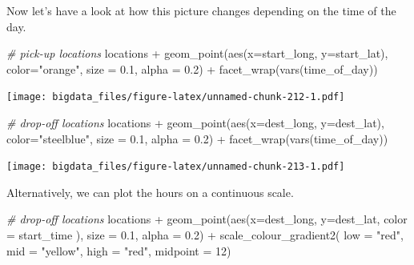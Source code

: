 \documentclass[
  12pt,
]{style/krantz}
\newenvironment{Shaded}{\begin{snugshade}}{\end{snugshade}}
\newcommand{\AttributeTok}[1]{\textcolor[rgb]{0.77,0.63,0.00}{#1}}
\newcommand{\CommentTok}[1]{\textcolor[rgb]{0.56,0.35,0.01}{\textit{#1}}}
\newcommand{\DecValTok}[1]{\textcolor[rgb]{0.00,0.00,0.81}{#1}}
\newcommand{\FloatTok}[1]{\textcolor[rgb]{0.00,0.00,0.81}{#1}}
\newcommand{\FunctionTok}[1]{\textcolor[rgb]{0.00,0.00,0.00}{#1}}
\newcommand{\NormalTok}[1]{#1}
\newcommand{\SpecialCharTok}[1]{\textcolor[rgb]{0.00,0.00,0.00}{#1}}
\newcommand{\StringTok}[1]{\textcolor[rgb]{0.31,0.60,0.02}{#1}}
\begin{document}
Now let's have a look at how this picture changes depending on the time of the day.

\begin{Shaded}
\begin{Highlighting}[]
\CommentTok{\# pick{-}up locations }
\NormalTok{locations }\SpecialCharTok{+}
     \FunctionTok{geom\_point}\NormalTok{(}\FunctionTok{aes}\NormalTok{(}\AttributeTok{x=}\NormalTok{start\_long, }\AttributeTok{y=}\NormalTok{start\_lat),}
                \AttributeTok{color=}\StringTok{"orange"}\NormalTok{,}
                \AttributeTok{size =} \FloatTok{0.1}\NormalTok{,}
                \AttributeTok{alpha =} \FloatTok{0.2}\NormalTok{) }\SpecialCharTok{+}
     \FunctionTok{facet\_wrap}\NormalTok{(}\FunctionTok{vars}\NormalTok{(time\_of\_day))}
\end{Highlighting}
\end{Shaded}

\texttt{[image: bigdata\_files/figure-latex/unnamed-chunk-212-1.pdf]}

\begin{Shaded}
\begin{Highlighting}[]
\CommentTok{\# drop{-}off locations }
\NormalTok{locations }\SpecialCharTok{+}
     \FunctionTok{geom\_point}\NormalTok{(}\FunctionTok{aes}\NormalTok{(}\AttributeTok{x=}\NormalTok{dest\_long, }\AttributeTok{y=}\NormalTok{dest\_lat),}
                \AttributeTok{color=}\StringTok{"steelblue"}\NormalTok{,}
                \AttributeTok{size =} \FloatTok{0.1}\NormalTok{,}
                \AttributeTok{alpha =} \FloatTok{0.2}\NormalTok{) }\SpecialCharTok{+}
     \FunctionTok{facet\_wrap}\NormalTok{(}\FunctionTok{vars}\NormalTok{(time\_of\_day))}
\end{Highlighting}
\end{Shaded}

\texttt{[image: bigdata\_files/figure-latex/unnamed-chunk-213-1.pdf]}

Alternatively, we can plot the hours on a continuous scale.

\begin{Shaded}
\begin{Highlighting}[]
\CommentTok{\# drop{-}off locations }
\NormalTok{locations }\SpecialCharTok{+}
     \FunctionTok{geom\_point}\NormalTok{(}\FunctionTok{aes}\NormalTok{(}\AttributeTok{x=}\NormalTok{dest\_long, }\AttributeTok{y=}\NormalTok{dest\_lat, }\AttributeTok{color =}\NormalTok{ start\_time ),}
                \AttributeTok{size =} \FloatTok{0.1}\NormalTok{,}
                \AttributeTok{alpha =} \FloatTok{0.2}\NormalTok{) }\SpecialCharTok{+}
     \FunctionTok{scale\_colour\_gradient2}\NormalTok{( }\AttributeTok{low =} \StringTok{"red"}\NormalTok{, }\AttributeTok{mid =} \StringTok{"yellow"}\NormalTok{, }\AttributeTok{high =} \StringTok{"red"}\NormalTok{,}
                             \AttributeTok{midpoint =} \DecValTok{12}\NormalTok{)}
\end{Highlighting}
\end{Shaded}
\end{document}
